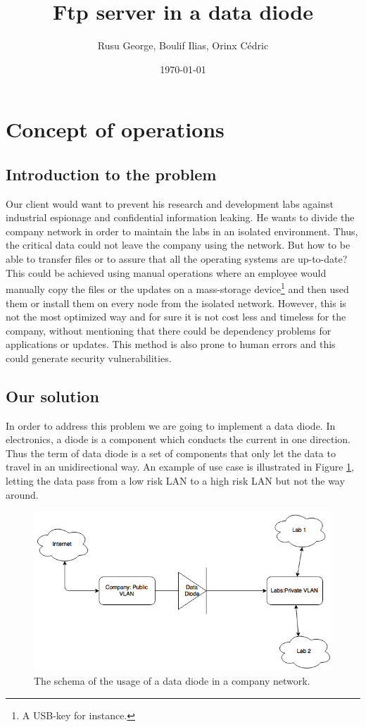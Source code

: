\documentclass[a4paper,10pt]{article}
\title{Ftp server in a data diode}
\author{Rusu George, Boulif Ilias, Orinx Cédric}
\date{\today}
\begin{document}
\maketitle
\newpage
\tableofcontents
\newpage
\section{Concept of operations}
\subsection{Introduction to the problem}
Our client would want to prevent his research and development labs against industrial espionage and confidential information leaking. He wants to divide the company network in order to maintain the labs in an isolated environment. Thus, the critical data could not leave the company using the network. But how to be able to transfer files or to assure that all the operating systems are up-to-date? This could be achieved using manual operations where an employee would manually copy the files or the updates on a mass-storage device\footnote{A USB-key for instance.} and then used them or install them on every node from the isolated network. However, this is not the most optimized way and for sure it is not cost less and timeless for the company, without mentioning that there could be dependency problems for applications or updates. This method is also prone to human errors and this could generate security vulnerabilities.

\subsection{Our solution}
In order to address this problem we are going to implement a data diode. In electronics, a diode is a component which conducts the current in one direction. Thus the term of data diode is a set of components that only let the data to travel in an unidirectional way. An example of use case is illustrated in Figure \ref{fig:datadiode}, letting the data pass from a low risk LAN to a high risk LAN but not the way around.

\begin{figure}
\centering
\includegraphics[scale=0.45]{images/dataDiode.png}
\caption{The schema of the usage of a data diode in a company network.}
\label{fig:datadiode}
\end{figure}
\end{document}
